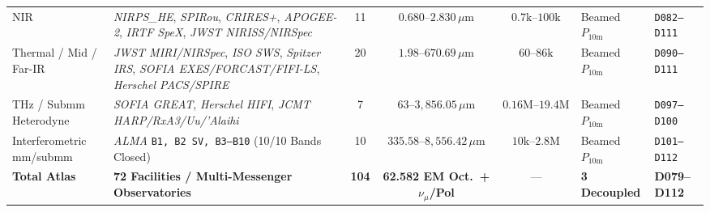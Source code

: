 \documentclass[twocolumn,10pt]{article}
\begin{document}
\begin{table}[t]
{\begin{tabular}{llcccll}
NIR & \textit{NIRPS\_HE}, \textit{SPIRou}, \textit{CRIRES+}, \textit{APOGEE-2}, \textit{IRTF SpeX}, \textit{JWST NIRISS/NIRSpec} & 11 & $0.680\text{--}2.830\,\mu\text{m}$ & $0.7\text{k--}100\text{k}$ & Beamed $P_{10\mathrm{m}}$ & \texttt{D082--D111} \\
Thermal / Mid / Far-IR & \textit{JWST MIRI/NIRSpec}, \textit{ISO SWS}, \textit{Spitzer IRS}, \textit{SOFIA EXES/FORCAST/FIFI-LS}, \textit{Herschel PACS/SPIRE} & 20 & $1.98\text{--}670.69\,\mu\text{m}$ & $60\text{--}86\text{k}$ & Beamed $P_{10\mathrm{m}}$ & \texttt{D090--D111} \\
THz / Submm Heterodyne & \textit{SOFIA GREAT}, \textit{Herschel HIFI}, \textit{JCMT HARP/RxA3/Uu/'Alaihi} & 7 & $63\text{--}3{,}856.05\,\mu\text{m}$ & $0.16\text{M--}19.4\text{M}$ & Beamed $P_{10\mathrm{m}}$ & \texttt{D097--D100} \\
Interferometric mm/submm & \textit{ALMA} \texttt{B1, B2 SV, B3--B10} (10/10 Bands Closed) & 10 & $335.58\text{--}8{,}556.42\,\mu\text{m}$ & $10\text{k--}2.8\text{M}$ & Beamed $P_{10\mathrm{m}}$ & \texttt{D101--D112} \\
\midrule
\textbf{Total Atlas} & \textbf{72 Facilities / Multi-Messenger Observatories} & \textbf{104} & \textbf{62.582 EM Oct.\ + $\nu_\mu$/Pol} & --- & \textbf{3 Decoupled} & \textbf{D079--D112} \\
\bottomrule
\end{tabular}%
}
\end{table}
\end{document}

